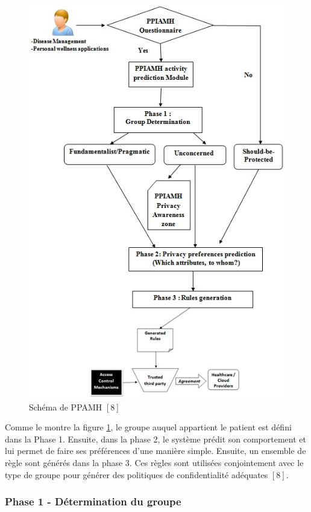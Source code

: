 \begin{figure}[!ht]
\begin{center}
\includegraphics[scale=0.72]{ppamh.jpg}
\caption{Schéma de PPAMH $[8]$}
\label{ppamh}
\end{center}
\end{figure}

Comme le montre la figure \ref{ppamh}, le groupe auquel appartient le patient est défini dans la Phase 1. Ensuite, dans la phase 2, le système prédit son comportement et lui permet de faire ses préférences d'une manière simple. Ensuite, un ensemble de règle sont générés dans la phase 3. Ces règles sont utilisées conjointement avec le type de groupe pour générer des politiques de confidentialité adéquates $[8]$.

\subsubsection{Phase 1 - Détermination du groupe}

